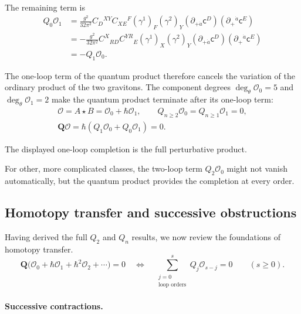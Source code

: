 \documentclass[11pt]{article}
\numberwithin{equation}{section}
\numberwithin{figure}{section}
\numberwithin{table}{section}
\begin{document}
The remaining term is
\begin{equation}\label{eq-2-66}
\begin{aligned}
Q_0\mathcal O_1
&=\frac{g^2}{32\pi^2}
C_D{}^{XY}C_{XE}{}^F(\gamma^1)_F(\gamma^2)_Y
(\partial_{+\dot a}\mathsf c^D)(\partial_+{}^{\dot a}\mathsf c^E)\\
&=-\frac{g^2}{32\pi^2}
C^X{}_{RD}C^{YR}{}_{E}(\gamma^1)_X(\gamma^2)_Y
(\partial_{+\dot a}\mathsf c^D)(\partial_+{}^{\dot a}\mathsf c^E)\\
&=-Q_1\mathcal O_0.
\end{aligned}
\end{equation}

The one-loop term of the quantum product therefore cancels the variation of the ordinary product of the two gravitons. The component degrees $\deg_\theta\mathcal O_0=5$ and $\deg_\theta\mathcal O_1=2$ make the quantum product terminate after its one-loop term:
\begin{equation}\label{eq-finiteexample}
\begin{gathered}
\mathcal O=A\star B=\mathcal O_0+\hbar\mathcal O_1,\qquad
Q_{n\ge2}\mathcal O_0=Q_{n\ge1}\mathcal O_1=0,\\
\mathbf Q\mathcal O
=\hbar(Q_1\mathcal O_0+Q_0\mathcal O_1)=0.
\end{gathered}
\end{equation}

The displayed one-loop completion is the full perturbative product.

For other, more complicated classes, the two-loop term $Q_2\mathcal O_0$ might not vanish automatically, but the quantum product provides the completion at every order.

\subsection{Homotopy transfer and successive obstructions}\label{sec-homotopy-transfer}

Having derived the full $Q_2$ and $Q_n$ results, we now review the foundations of homotopy transfer.
\begin{equation}\label{eq-liftingequations}
\mathbf Q\bigl(\mathcal O_0+\hbar\mathcal O_1+\hbar^2\mathcal O_2+\cdots\bigr)=0
\quad\Longleftrightarrow\quad
\sum_{\substack{j=0\\\text{loop orders}}}^{s}Q_j\mathcal O_{s-j}=0
\qquad(s\ge0).
\end{equation}

\paragraph{Successive contractions.}\label{successive-contractions}
\end{document}
